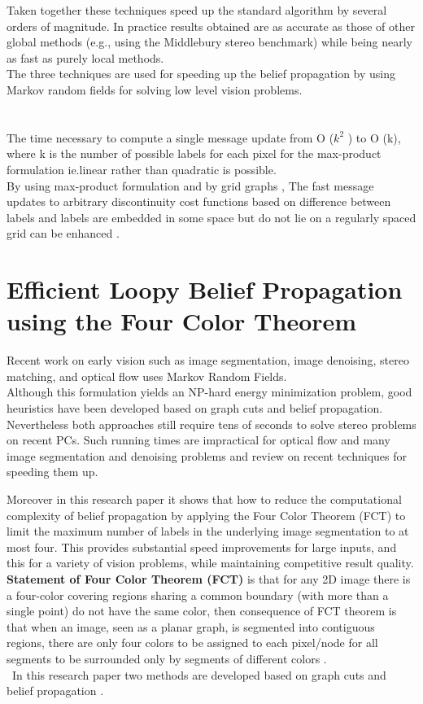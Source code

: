 Taken together these techniques speed up the standard algorithm by several orders of magnitude. In practice results  obtained   are as accurate as those of other global methods (e.g., using the Middlebury stereo benchmark) while being nearly as fast as purely local methods.
\\The three techniques are used for speeding up the belief propagation by using Markov random fields for solving low level vision problems.
\\\\\ \\ The time necessary to compute a single message update from O ($k^2$ ) to O (k), where k is the number of possible labels for each pixel for the max-product formulation ie.linear rather than quadratic is possible.
\\By using max-product formulation and by grid graphs , The fast message updates to arbitrary discontinuity cost functions based on difference between labels and labels are embedded in some space but do not lie on a regularly spaced grid can be enhanced .





\section{Efficient Loopy Belief Propagation using the Four Color Theorem}
Recent work on early vision such as image segmentation, image  denoising, stereo matching, and optical flow uses Markov Random Fields.\\ Although this formulation yields an NP-hard energy minimization problem, good heuristics have been developed based on graph cuts and belief propagation.\\ Nevertheless both approaches still require tens of seconds to solve stereo problems on recent PCs. Such running times are impractical for optical flow and many image segmentation and
denoising problems and review on  recent techniques for speeding them up.

Moreover in this research paper it shows that  how to reduce the computational complexity of belief propagation by applying the Four Color Theorem (FCT) to limit the maximum number of labels in the underlying image segmentation to at most four. This provides substantial speed improvements for large inputs, and this for a variety of vision problems, while maintaining competitive result quality.
\\ \textbf{Statement of Four Color Theorem (FCT) }is that for any 2D image there is a four-color covering  regions sharing a common boundary (with more than a single
point) do not have the same color, then consequence of FCT theorem is that when
an image, seen as a planar graph, is segmented into contiguous regions, there
are only four colors to be assigned to each pixel/node for all segments to be
surrounded only by segments of different colors .
\\\ In this research paper two methods are developed based on graph cuts  and belief propagation .

